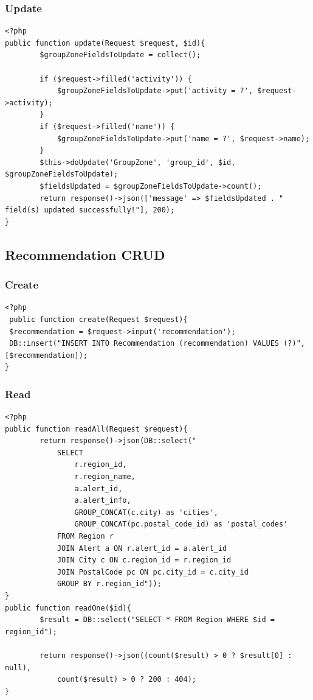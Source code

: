 \documentclass{article}
\begin{document}
\subsubsection{Update}
\begin{verbatim}
<?php
public function update(Request $request, $id){
        $groupZoneFieldsToUpdate = collect();
        
        if ($request->filled('activity')) {
            $groupZoneFieldsToUpdate->put('activity = ?', $request->activity);
        }
        if ($request->filled('name')) {
            $groupZoneFieldsToUpdate->put('name = ?', $request->name);
        }
        $this->doUpdate('GroupZone', 'group_id', $id, $groupZoneFieldsToUpdate);
        $fieldsUpdated = $groupZoneFieldsToUpdate->count();
        return response()->json(['message' => $fieldsUpdated . " field(s) updated successfully!"], 200);
}
\end{verbatim}
\subsection{Recommendation CRUD}
\subsubsection{Create}
\begin{verbatim}
<?php
 public function create(Request $request){
 $recommendation = $request->input('recommendation');
 DB::insert("INSERT INTO Recommendation (recommendation) VALUES (?)", [$recommendation]);
}
\end{verbatim}
\subsubsection{Read}
\begin{verbatim}
<?php
public function readAll(Request $request){
        return response()->json(DB::select("
            SELECT
                r.region_id,
                r.region_name,
                a.alert_id,
                a.alert_info,
                GROUP_CONCAT(c.city) as 'cities',
                GROUP_CONCAT(pc.postal_code_id) as 'postal_codes'
            FROM Region r
            JOIN Alert a ON r.alert_id = a.alert_id
            JOIN City c ON c.region_id = r.region_id
            JOIN PostalCode pc ON pc.city_id = c.city_id
            GROUP BY r.region_id"));
}
public function readOne($id){
        $result = DB::select("SELECT * FROM Region WHERE $id = region_id");

        return response()->json((count($result) > 0 ? $result[0] : null),
            count($result) > 0 ? 200 : 404);
}

\end{verbatim}
\end{document}

